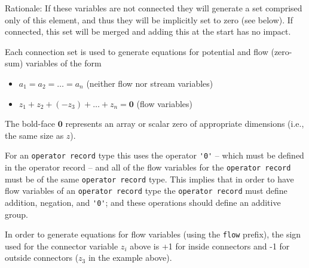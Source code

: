 \begin{nonnormative}
Rationale: If these variables are not connected they will generate a set comprised only of this element, and thus they will be implicitly set to zero (see below).
If connected, this set will be merged and adding this at the start has no impact.
\end{nonnormative}

Each connection set is used to generate equations for potential and flow (zero-sum) variables of the form
\begin{itemize}
\item
  $a_{1} = a_{2} = \ldots = a_{n}$ (neither flow nor stream variables)
\item
  $z_{1} + z_{2} + (-z_{3}) + \ldots + z_{n} = \mathbf{0}$ (flow variables)
\end{itemize}

The bold-face $\mathbf{0}$ represents an array or scalar zero of appropriate dimensions (i.e., the same size as $z$).

For an \lstinline!operator record! type this uses the operator \lstinline!'0'! -- which must be defined in the operator record -- and all of the flow variables for the \lstinline!operator record!
must be of the same \lstinline!operator record! type.
This implies that in order to have flow variables of an \lstinline!operator record! type the \lstinline!operator record! must define addition, negation, and \lstinline!'0'!; and these operations should define an additive group.

In order to generate equations for flow variables (using the \lstinline!flow! prefix), the sign used for the connector variable $z_{i}$ above is +1 for inside connectors and -1 for outside connectors ($z_{3}$ in the example above).

